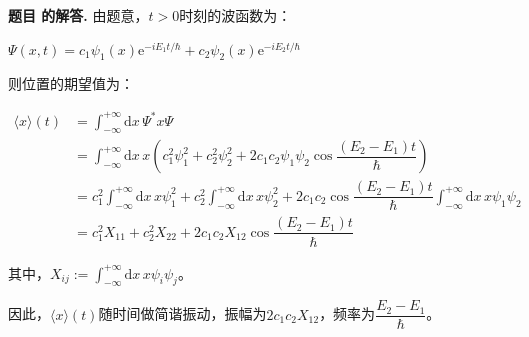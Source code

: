 \documentclass[12pt, a4paper, oneside]{ctexart}
\newcounter{problemname}
\newenvironment{solution}
  {\par\noindent\textbf{题目 \theproblemname 的解答. }}
  {\par}
\begin{document}
\begin{solution}
    由题意，$t>0$时刻的波函数为：

    \centerline{$\Psi(x,t) = c_1 \psi_1(x) \mathrm{e}^{-iE_1t/\hbar} + c_2 \psi_2(x) \mathrm{e}^{-iE_2t/\hbar}$}

    则位置的期望值为：

    \begin{align*}
        \langle x\rangle(t) &= \displaystyle \int_{-\infty}^{+\infty} \mathrm{d}x \, \Psi^* x \Psi \\
        &= \displaystyle \int_{-\infty}^{+\infty} \mathrm{d}x \, x \left( c_1^2 \psi_1^2 + c_2^2 \psi_2^2 + 2c_1c_2\psi_1\psi_2\cos\dfrac{(E_2-E_1)t}{\hbar}\right)\\
        &= c_1^2 \displaystyle \int_{-\infty}^{+\infty} \mathrm{d}x \, x  \psi_1^2 + c_2^2  \displaystyle \int_{-\infty}^{+\infty} \mathrm{d}x \, x  \psi_2^2 + 2c_1c_2\cos\dfrac{(E_2-E_1)t}{\hbar}  \displaystyle \int_{-\infty}^{+\infty} \mathrm{d}x \, x  \psi_1\psi_2\\
        &= c_1^2 X_{11} + c_2^2 X_{22} + 2c_1c_2 X_{12}\cos\dfrac{(E_2-E_1)t}{\hbar}
    \end{align*}

    其中，$X_{ij} :=  \displaystyle \int_{-\infty}^{+\infty} \mathrm{d}x \, x  \psi_i\psi_j$。

    因此，$\langle x\rangle(t)$随时间做简谐振动，振幅为$2c_1c_2 X_{12}$，频率为$\dfrac{E_2-E_1}{\hbar}$。
\end{solution}
\end{document}
